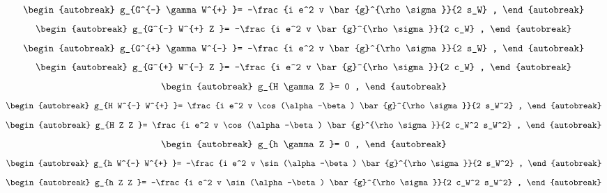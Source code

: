 \begin{align}
\begin{autobreak}
g_{G^{-} \gamma W^{+} }=
	-\frac{i e^2 v \bar{g}^{\rho \sigma }}{2 s_W}
	,
\end{autobreak}
\end{align}
\begin{align}
\begin{autobreak}
g_{G^{-} W^{+} Z }=
	-\frac{i e^2 v \bar{g}^{\rho \sigma }}{2 c_W}
	,
\end{autobreak}
\end{align}
\begin{align}
\begin{autobreak}
g_{G^{+} \gamma W^{-} }=
	-\frac{i e^2 v \bar{g}^{\rho \sigma }}{2 s_W}
	,
\end{autobreak}
\end{align}
\begin{align}
\begin{autobreak}
g_{G^{+} W^{-} Z }=
	-\frac{i e^2 v \bar{g}^{\rho \sigma }}{2 c_W}
	,
\end{autobreak}
\end{align}
\begin{align}
\begin{autobreak}
g_{H \gamma Z }=
	0
	,
\end{autobreak}
\end{align}
\begin{align}
\begin{autobreak}
g_{H W^{-} W^{+} }=
	\frac{i e^2 v \cos (\alpha -\beta ) \bar{g}^{\rho \sigma }}{2 s_W^2}
	,
\end{autobreak}
\end{align}
\begin{align}
\begin{autobreak}
g_{H Z Z }=
	\frac{i e^2 v \cos (\alpha -\beta ) \bar{g}^{\rho \sigma }}{2 c_W^2 s_W^2}
	,
\end{autobreak}
\end{align}
\begin{align}
\begin{autobreak}
g_{h \gamma Z }=
	0
	,
\end{autobreak}
\end{align}
\begin{align}
\begin{autobreak}
g_{h W^{-} W^{+} }=
	-\frac{i e^2 v \sin (\alpha -\beta ) \bar{g}^{\rho \sigma }}{2 s_W^2}
	,
\end{autobreak}
\end{align}
\begin{align}
\begin{autobreak}
g_{h Z Z }=
	-\frac{i e^2 v \sin (\alpha -\beta ) \bar{g}^{\rho \sigma }}{2 c_W^2 s_W^2}
	,
\end{autobreak}
\end{align}
